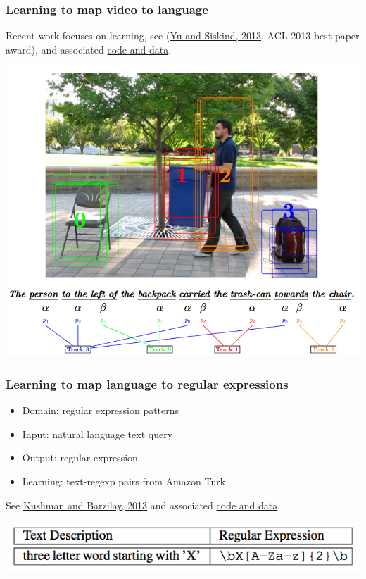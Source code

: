 \documentclass[ignorenonframetext]{beamer}
\begin{document}
\begin{frame}\frametitle{Learning to map video to language}
Recent work focuses on learning, see
(\href{http://aclweb.org/anthology/P/P13/P13-1006.pdf}{Yu and Siskind,
  2013}, ACL-2013 best paper award), and associated
\href{http://haonanyu.com/research/acl2013/}{code and data}.
\vspace{1em}

\begin{center}
\href{http://haonanyu.com/research/acl2013/}{
\includegraphics[height=.7\textheight]{images/siskind-video.png}}
\end{center}
\end{frame}


\begin{frame}\frametitle{Learning to map language to regular expressions}

\begin{itemize}
\item Domain: regular expression patterns
\item Input: natural language text query
\item Output: regular expression
\item Learning: text-regexp pairs from Amazon Turk
\end{itemize}

See \href{http://www.aclweb.org/anthology/N13-1103}{Kushman and
  Barzilay, 2013} and associated
\href{http://groups.csail.mit.edu/rbg/code/regexp/}{code and data}.

\begin{center}
\includegraphics[width=\textwidth]{images/kushman-regexp.png}
\end{center}
\end{frame}
\end{document}
